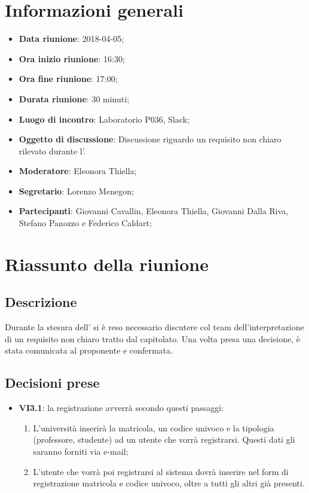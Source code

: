 \section{Informazioni generali}
	\begin{itemize}
		\item \textbf{Data riunione}: 2018-04-05;
		\item \textbf{Ora inizio riunione}: 16:30;
		\item \textbf{Ora fine riunione}: 17:00;
		\item \textbf{Durata riunione}: 30 minuti;
		\item \textbf{Luogo di incontro}: Laboratorio P036, Slack;
		\item \textbf{Oggetto di discussione}: Discussione riguardo un requisito non chiaro rilevato durante l'\AdR{}.
		\item \textbf{Moderatore}: Eleonora Thiella;
		\item \textbf{Segretario}: Lorenzo Menegon;
		\item \textbf{Partecipanti}: Giovanni Cavallin, Eleonora Thiella, Giovanni Dalla Riva, Stefano Panozzo e Federico Caldart;
	\end{itemize}

\section{Riassunto della riunione}
	\subsection{Descrizione}
	Durante la stesura dell'\AdR{} si è reso necessario discutere col team dell'interpretazione di un requisito non chiaro tratto dal capitolato. Una volta presa una decisione, è stata comunicata al proponente e confermata.
	\subsection{Decisioni prese}
		\begin{itemize}
			\item \textbf{VI3.1}: la registrazione avverrà secondo questi passaggi:
			\begin{enumerate}
				\item L'università inserirà la matricola, un codice univoco e la tipologia (professore, studente) ad un utente che vorrà registrarsi. Questi dati gli saranno forniti via e-mail;
				\item L'utente che vorrà poi registrarsi al sistema dovrà inserire nel form di registrazione matricola e codice univoco, oltre a tutti gli altri già presenti.
			\end{enumerate}
		\end{itemize}

